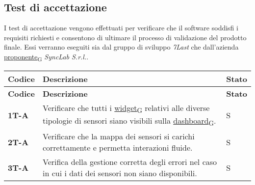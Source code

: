 \subsection{Test di accettazione}
I test di accettazione vengono effettuati per verificare che il software soddisfi i requisiti richiesti e consentono di ultimare il processo di validazione del prodotto finale.
Essi verranno eseguiti sia dal gruppo di sviluppo \textit{7Last} che dall'azienda \href{https://7last.github.io/docs/pb/documentazione-interna/glossario\#proponente}{proponente\textsubscript{G}} \textit{SyncLab S.r.l.}. \\
\begin{longtable}{|>{\raggedright\arraybackslash}m{}|>{\raggedright\arraybackslash}m{}|>{\raggedright\arraybackslash}m{}|}
	\hline
	\textbf{Codice} & \textbf{Descrizione}                                                                                                                                                                                                                                                                                            & \textbf{Stato} \\
	\hline
	\endfirsthead
	\hline
	\textbf{Codice} & \textbf{Descrizione}                                                                                                                                                                                                                                                                                            & \textbf{Stato} \\
	\endhead
	\textbf{1T-A}   & Verificare che tutti i \href{https://7last.github.io/docs/pb/documentazione-interna/glossario\#widget}{widget\textsubscript{G}} relativi alle diverse tipologie di sensori siano visibili sulla \href{https://7last.github.io/docs/pb/documentazione-interna/glossario\#dashboard}{dashboard\textsubscript{G}}. & S              \\
	\hline
	\textbf{2T-A}   & Verificare che la mappa dei sensori si carichi correttamente e permetta interazioni fluide.                                                                                                                                                                                                                     & S              \\
	\hline
	\textbf{3T-A}   & Verifica della gestione corretta degli errori nel caso in cui i dati dei sensori non siano disponibili.                                                                                                                                                                                                         & S              \\

\end{longtable}
